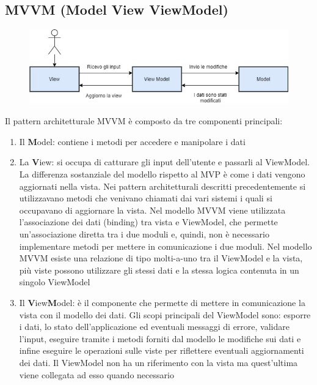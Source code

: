 \documentclass[12pt]{report}
\begin{document}
\subsection{MVVM (Model View ViewModel)}

\begin{figure}[H]
	\centering
	\includegraphics[width=0.7\linewidth]{immagini/mvvm}
	\caption{}
	\label{fig:mvc}
\end{figure}
Il pattern architetturale MVVM è composto da tre componenti principali:
\begin{enumerate}
	\item Il \textbf{M}odel: contiene i metodi per accedere e manipolare i dati %
	\item La \textbf{V}iew: si occupa di catturare gli input dell'utente e passarli al ViewModel. La differenza sostanziale del modello rispetto al MVP è come i dati vengono aggiornati nella vista. Nei pattern architetturali descritti precedentemente si utilizzavano metodi che venivano chiamati dai vari sistemi i quali si occupavano di aggiornare la vista. Nel modello MVVM viene utilizzata l'associazione dei dati (binding) tra vista e ViewModel, che permette un'associazione diretta tra i due moduli e, quindi, non è necessario implementare metodi per mettere in comunicazione i due moduli. Nel modello MVVM esiste una relazione di tipo molti-a-uno tra il ViewModel e la vista, più viste possono utilizzare gli stessi dati e la stessa logica contenuta in un singolo ViewModel
	\item Il \textbf{V}iew\textbf{M}odel: è il componente che permette di mettere in comunicazione la vista con il modello dei dati. %
	Gli scopi principali del ViewModel sono: esporre i dati, lo stato dell'applicazione ed eventuali messaggi di errore, validare l'input, eseguire tramite i metodi forniti dal modello le modifiche sui dati e infine eseguire le operazioni sulle viste per riflettere eventuali aggiornamenti dei dati. Il ViewModel non ha un riferimento con la vista ma quest'ultima viene collegata ad esso quando necessario %

\end{enumerate}
\end{document}
